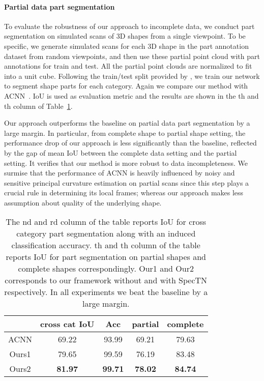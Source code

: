 \documentclass[10pt,twocolumn,letterpaper]{article}
\newcommand{\mypara}{\vspace*{-15pt}\paragraph}
\begin{document}
\mypara{Partial data part segmentation}
To evaluate the robustness of our approach to incomplete data, we conduct part segmentation on simulated scans of 3D shapes from a single viewpoint. To be specific, we generate  simulated scans for each 3D shape in the part annotation dataset \cite{Yi16} from random viewpoints, and then use these partial point cloud with part annotations for train and test. All the partial point clouds are normalized to fit into a unit cube. Following the train/test split provided by \cite{shapenet2015}, we train our network to segment shape parts for each category. Again we compare our method with ACNN~\cite{boscaini2016learning}. IoU is used as evaluation metric and the results are shown in the th and th column of Table~\ref{tab:partialseg}.

Our approach outperforms the baseline on partial data part segmentation by a large margin. In particular, from complete shape to partial shape setting, the performance drop of our approach is less significantly than the baseline, reflected by the gap of mean IoU between the complete data setting and the partial setting. It verifies that our method is more robust to data incompleteness. We surmise that the performance of ACNN is heavily influenced by noisy and sensitive principal curvature estimation on partial scans since this step plays a crucial rule in determining its local frames; whereas our approach makes less assumption about quality of the underlying shape.

\begin{table}[t!]
\centering
\small
\begin{tabular}{@{}c|cc|cc}
\hline
& cross cat IoU & Acc & partial & complete\\ \hline
ACNN & 69.22 & 93.99 & 69.21 & 79.63 \\ \hline
Ours1 & 79.65 & 99.59 & 76.19 & 83.48 \\
Ours2 & \textbf{81.97} & \textbf{99.71} & \textbf{78.02} & \textbf{84.74} \\ \hline
\end{tabular}
\caption{The nd and rd column of the table reports IoU for cross category part segmentation along with an induced classification accuracy. th and th column of the table reports IoU for part segmentation on partial shapes and complete shapes correspondingly. Our1 and Our2 corresponds to our framework without and with SpecTN respectively. In all experiments we beat the baseline by a large margin.}
\label{tab:partialseg}
\vspace{-0.6cm}
\end{table}
\end{document}
